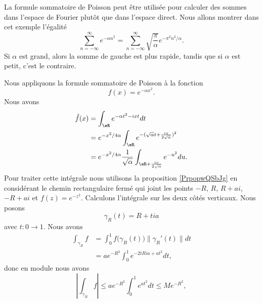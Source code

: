 \begin{example}\label{ExDLjesf}
    La formule sommatoire de Poisson peut être utilisée pour calculer des sommes dans l'espace de Fourier plutôt que dans l'espace direct. Nous allons montrer dans cet exemple l'égalité
    \begin{equation}
        \sum_{n=-\infty}^{\infty} e^{-\alpha n^2}=\sum_{n=-\infty}^{\infty}\sqrt{\frac{ \pi }{ \alpha }} e^{-\pi^2 n^2/\alpha}.
    \end{equation}
    Si \( \alpha\) est grand, alors la somme de gauche est plus rapide, tandis que si \( \alpha\) est petit, c'est le contraire.

    Nous appliquons la formule sommatoire de Poisson à la fonction
    \begin{equation}
        f(x)= e^{-\alpha x^2}.
    \end{equation}
    Nous avons
    \begin{subequations}        \label{EqCDeLht}
        \begin{align}
            \hat f(x)&=\int_{\eR} e^{-\alpha t^2-ixt}dt\\
            &= e^{-x^2/4\alpha}\int_{\eR}e^{ -(\sqrt{\alpha}t+\frac{ ix }{ 2\sqrt{\alpha} })^2 }\\
            &= e^{-x^2/4\alpha}\frac{1}{ \sqrt{\alpha} }\int_{\eR+\frac{ ix }{ 2\sqrt{\alpha} }} e^{-u^2}du.
        \end{align}
    \end{subequations}
    Pour traiter cette intégrale nous utilisons la proposition \ref{PrpopwQSbJg} en considérant le chemin rectangulaire fermé qui joint les points \( -R\), \( R\), \( R+ai\), \( -R+ai\) et \( f(z)= e^{-z^2}\). Calculons l'intégrale sur les deux côtés verticaux. Nous posons
    \begin{equation}
        \gamma_R(t)=R+tia
    \end{equation}
    avec \( t\colon 0\to 1\). Nous avons
    \begin{subequations}
        \begin{align}
            \int_{\gamma_R}f&=\int_0^1f\big( \gamma_R(t) \big)\| \gamma_R'(t) \|dt\\
            &=a e^{-R^2}\int_0^1 e^{-2tRia+at^2}dt,
        \end{align}
    \end{subequations}
    donc en module nous avons
    \begin{equation}
        | \int_{\gamma_R}f |\leq a e^{-R^2}\int_0^1 e^{at^2}dt\leq M e^{-R^2},

\end{equation}
\end{example}
